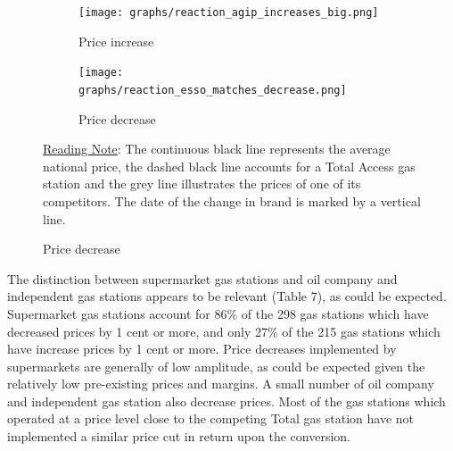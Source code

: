 \documentclass[english]{article}
\begin{document}
\begin{figure}[htb!]
\centering
\caption{Examples of price series of Total Access competitors}
\label{fig:price_reaction_examples}
\begin{subfigure}[b]{\textwidth}
\centering
\texttt{[image: graphs/reaction\_agip\_increases\_big.png]}
\caption[short]{Price increase}
\end{subfigure}
\begin{subfigure}[b]{\textwidth}
\centering
\texttt{[image: graphs/reaction\_esso\_matches\_decrease.png]}
\caption[short]{Price decrease}
\end{subfigure}
\flushleft
{\footnotesize\uline{Reading Note}: The continuous black line represents the average national price, the dashed black line accounts for a Total Access gas station and the grey line illustrates the prices of one of its competitors. The date of the change in brand is marked by a vertical line.}
\end{figure}

The distinction between supermarket gas stations and oil company and independent gas stations appears to be relevant (Table 7), as could be expected. Supermarket gas stations account for 86\% of the 298 gas stations which have decreased prices by 1 cent or more, and only 27\% of the 215 gas stations which have increase prices by 1 cent or more. Price decreases implemented by supermarkets are generally of low amplitude, as could be expected given the relatively low pre-existing prices and margins. A small number of oil company and independent gas station also decrease prices. Most of the gas stations which operated at a price level close to the competing Total gas station have not implemented a similar price cut in return upon
the conversion.
\end{document}
